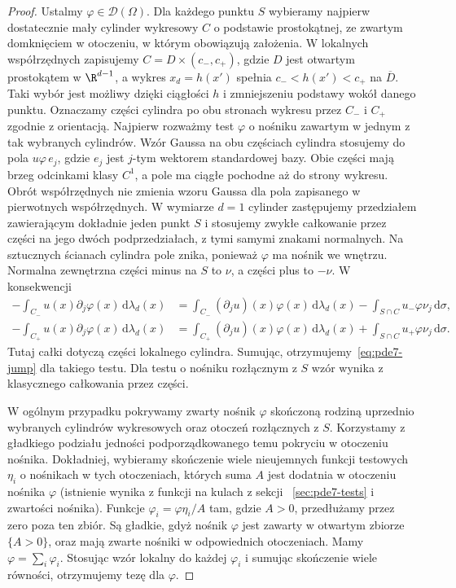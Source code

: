 \begin{proof}
Ustalmy $\varphi\in\mathcal D(\Omega)$.
Dla każdego punktu $S$ wybieramy najpierw
dostatecznie mały cylinder wykresowy $C$
o podstawie prostokątnej, ze zwartym domknięciem
w otoczeniu, w którym obowiązują założenia.
W lokalnych współrzędnych zapisujemy
$C=D\times(c_-,c_+)$, gdzie $D$ jest otwartym
prostokątem w $\R^{d-1}$, a wykres $x_d=h(x')$
spełnia $c_-<h(x')<c_+$ na $\overline D$.
Taki wybór jest możliwy dzięki ciągłości $h$
i zmniejszeniu podstawy wokół danego punktu.
Oznaczamy części cylindra po obu stronach
wykresu przez $C_-$ i $C_+$ zgodnie z orientacją.
Najpierw rozważmy test $\varphi$ o nośniku
zawartym w jednym z tak wybranych cylindrów.
Wzór Gaussa na obu częściach cylindra stosujemy
do pola $u\varphi\,e_j$, gdzie $e_j$ jest $j$-tym
wektorem standardowej bazy. Obie części mają
brzeg odcinkami klasy $C^1$, a pole ma ciągłe
pochodne aż do strony wykresu.
Obrót współrzędnych nie zmienia wzoru Gaussa
dla pola zapisanego w pierwotnych współrzędnych.
W wymiarze $d=1$ cylinder zastępujemy przedziałem
zawierającym dokładnie jeden punkt $S$ i stosujemy
zwykłe całkowanie przez części na jego dwóch
podprzedziałach, z tymi samymi znakami normalnych.
Na sztucznych ścianach cylindra pole znika,
ponieważ $\varphi$ ma nośnik we wnętrzu.
Normalna zewnętrzna części minus na $S$ to $\nu$,
a części plus to $-\nu$. W konsekwencji
\[
 \begin{aligned}
 -\int_{C_-}u(x)\partial_j\varphi(x)\,\mathrm d\lambda_d(x)
 &=\int_{C_-}(\partial_ju)(x)\varphi(x)\,\mathrm d\lambda_d(x)
   -\int_{S\cap C} u_-\varphi\nu_j\,\mathrm d\sigma,\\
 -\int_{C_+}u(x)\partial_j\varphi(x)\,\mathrm d\lambda_d(x)
 &=\int_{C_+}(\partial_ju)(x)\varphi(x)\,\mathrm d\lambda_d(x)
   +\int_{S\cap C} u_+\varphi\nu_j\,\mathrm d\sigma.
 \end{aligned}
\]
Tutaj całki dotyczą części lokalnego cylindra.
Sumując, otrzymujemy~\eqref{eq:pde7-jump} dla takiego
testu. Dla testu o nośniku rozłącznym z $S$ wzór
wynika z klasycznego całkowania przez części.

W ogólnym przypadku pokrywamy zwarty nośnik
$\varphi$ skończoną rodziną uprzednio wybranych
cylindrów wykresowych oraz otoczeń rozłącznych
z $S$. Korzystamy z gładkiego
podziału jedności podporządkowanego temu pokryciu
w otoczeniu nośnika. Dokładniej, wybieramy skończenie
wiele nieujemnych funkcji testowych $\eta_i$
o nośnikach w tych otoczeniach, których suma $A$
jest dodatnia w otoczeniu nośnika $\varphi$
(istnienie wynika z funkcji na kulach z sekcji
~\ref{sec:pde7-tests} i zwartości nośnika).
Funkcje $\varphi_i=\varphi\eta_i/A$ tam, gdzie $A>0$,
przedłużamy przez zero poza ten zbiór.
Są gładkie, gdyż nośnik $\varphi$ jest zawarty
w otwartym zbiorze $\{A>0\}$, oraz mają zwarte
nośniki w odpowiednich otoczeniach.
Mamy $\varphi=\sum_i\varphi_i$. Stosując wzór
lokalny do każdej $\varphi_i$ i sumując skończenie
wiele równości, otrzymujemy tezę dla $\varphi$.
\end{proof}


